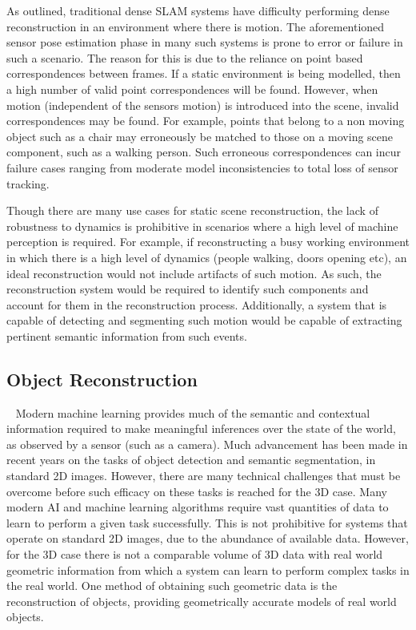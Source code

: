 As outlined, traditional dense SLAM systems have difficulty performing dense reconstruction in an 
environment where there is motion. The aforementioned sensor pose estimation phase in many such systems
is prone to error or failure in such a scenario. The reason for this is due to the reliance on point based 
correspondences between frames. If a static environment is being modelled, then a high number of valid point 
correspondences will be found. However, when motion (independent of the sensors motion) is introduced into 
the scene, invalid correspondences may be found. For example, points that belong to a non moving object 
such as a chair may erroneously be matched to those on a moving scene component, such as a walking person.
Such erroneous correspondences can incur failure cases ranging from moderate model inconsistencies to total 
loss of sensor tracking.

Though there are many use cases for static scene reconstruction, the lack of robustness to dynamics is 
prohibitive in scenarios where a high level of machine perception is required. For example, if 
reconstructing a busy working environment in which there is a high level of dynamics (people walking, 
doors opening etc), an ideal reconstruction would not include artifacts of such motion. As such, the 
reconstruction system would be required to identify such components and account for them in the 
reconstruction process. Additionally, a system that is capable of detecting and segmenting such motion 
would be capable of extracting pertinent semantic information from such events.

\subsection{Object Reconstruction}
~\label{subsec:intro_object_recon}
Modern machine learning provides much of the semantic and contextual information required to make meaningful 
inferences over the state of the world, as observed by a sensor (such as a camera). Much advancement 
has been made in recent years on the tasks of object detection and semantic segmentation, in standard 2D 
images. However, there are many technical challenges that must be overcome before such efficacy on these 
tasks is reached for the 3D case. Many modern AI and machine learning algorithms require vast quantities of 
data to learn to perform a given task successfully. This is not prohibitive for systems that operate on standard 
2D images, due to the abundance of available data. However, for the 3D case there is not a comparable volume of 
3D data with real world geometric information from which a system can learn to perform complex tasks in the real 
world. One method of obtaining such geometric data is the reconstruction of objects, providing geometrically 
accurate models of real world objects.

